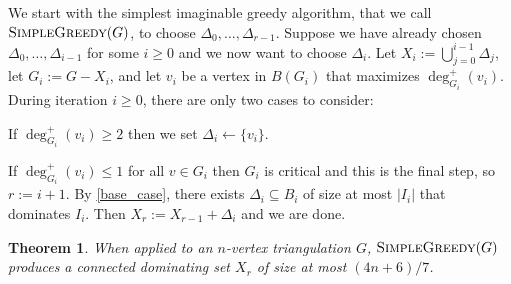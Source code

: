 \documentclass[12pt]{article}
\newtheorem{thm}{Theorem}
\begin{document}
We start with the simplest imaginable greedy algorithm, that we call $\textsc{SimpleGreedy}(G)$, to choose $\Delta_0,\ldots,\Delta_{r-1}$.  Suppose we have already chosen $\Delta_0,\ldots,\Delta_{i-1}$ for some $i\ge 0$ and we now want to choose $\Delta_i$.  Let $X_i:=\bigcup_{j=0}^{i-1}\Delta_j$, let $G_i:=G-X_i$, and let $v_i$ be a vertex in $B(G_i)$ that maximizes $\deg^+_{G_i}(v_i)$.  During iteration $i\ge 0$, there are only two cases to consider:
\begin{compactenum}
    \item If $\deg^+_{G_i}(v_i)\ge 2$ then we set $\Delta_i\gets\{v_i\}$.
    \item If $\deg^+_{G_i}(v_i)\le 1$ for all $v\in G_i$ then $G_i$ is critical and this is the final step, so $r:=i+1$.  By \cref{base_case}, there exists $\Delta_i\subseteq B_i$ of size at most $|I_i|$ that dominates $I_i$. Then $X_r:=X_{r-1}+\Delta_{i}$ and we are done.
\end{compactenum}

\begin{thm}\label{simple_greedy}
  When applied to an $n$-vertex triangulation $G$,  $\textsc{SimpleGreedy}(G)$ produces a connected dominating set $X_r$ of size at most $(4n+6)/7$.
\end{thm}
\end{document}
